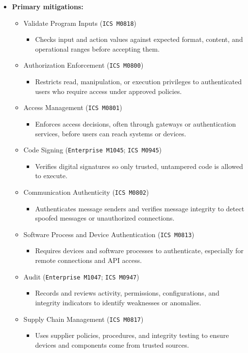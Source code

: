\documentclass[10pt,a4paper,oneside]{report}
\begin{document}
\begin{itemize}
\item \textbf{Primary mitigations:}
\begin{itemize}
\item Validate Program Inputs (\texttt{ICS M0818})
\begin{itemize}
\item Checks input and action values against expected format, content, and operational ranges before accepting them.
\end{itemize}
\item Authorization Enforcement (\texttt{ICS M0800})
\begin{itemize}
\item Restricts read, manipulation, or execution privileges to authenticated users who require access under approved policies.
\end{itemize}
\item Access Management (\texttt{ICS M0801})
\begin{itemize}
\item Enforces access decisions, often through gateways or authentication services, before users can reach systems or devices.
\end{itemize}
\item Code Signing (\texttt{Enterprise M1045}; \texttt{ICS M0945})
\begin{itemize}
\item Verifies digital signatures so only trusted, untampered code is allowed to execute.
\end{itemize}
\item Communication Authenticity (\texttt{ICS M0802})
\begin{itemize}
\item Authenticates message senders and verifies message integrity to detect spoofed messages or unauthorized connections.
\end{itemize}
\item Software Process and Device Authentication (\texttt{ICS M0813})
\begin{itemize}
\item Requires devices and software processes to authenticate, especially for remote connections and API access.
\end{itemize}
\item Audit (\texttt{Enterprise M1047}; \texttt{ICS M0947})
\begin{itemize}
\item Records and reviews activity, permissions, configurations, and integrity indicators to identify weaknesses or anomalies.
\end{itemize}
\item Supply Chain Management (\texttt{ICS M0817})
\begin{itemize}
\item Uses supplier policies, procedures, and integrity testing to ensure devices and components come from trusted sources.
\end{itemize}
\end{itemize}
\end{itemize}
\end{document}
